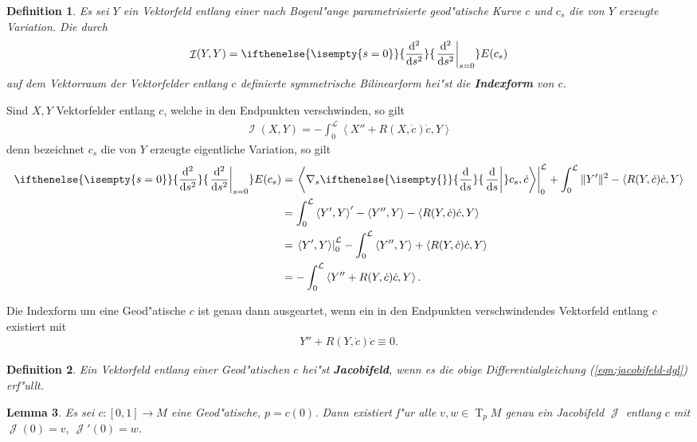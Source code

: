 \documentclass[paper=A4, twoside, chapterprefix=true, bibliography=totoc, headsepline]{scrbook}
\DeclareMathOperator{\calI}{\mathcal{I}}
\DeclareMathOperator{\calJ}{\mathcal{J}}
\DeclareMathOperator{\T}{T} %
\newcommand{\dop}{\mathrm{d}}
\newcommand{\difffrac}[3][]{\ifthenelse{\isempty{#1}}{\frac{\dop #2}{\dop #3}}{\left. \frac{\dop #2}{\dop #3} \right|_{#1}}}
\theoremstyle{plain}
\newtheorem{Dfn}{Definition}[chapter]
\newtheorem{Lemma}[Dfn]{Lemma}
\theoremstyle{nonumberplain}
\theoremstyle{empty}
\theoremstyle{break}
\newcommand{\CmIndex}[2][]{\ifthenelse{\isempty{#1}}{\index{#2}}{\index{#1}}#2}
\newcommand{\CmMark}[2][]{\textbf{\CmIndex[#1]{#2}}}
\begin{document}
\begin{Dfn}
  Es sei $Y$ ein Vektorfeld entlang einer nach Bogenl"ange parametrisierte geod"atische Kurve $c$ und $c_s$ die von $Y$ erzeugte Variation. Die durch
  \begin{align*}
    \calI(Y,Y) = \difffrac[s=0]{^2}{s^2} E(c_s)
  \end{align*}
  auf dem Vektorraum der Vektorfelder entlang $c$ definierte symmetrische Bilinearform hei"st die \CmMark{Indexform} von $c$.
\end{Dfn}

Sind $X,Y$ Vektorfelder entlang $c$, welche in den Endpunkten
verschwinden, so gilt
\begin{align*}
  \calI(X,Y) = -\int_0^{\mathcal L}\left<X'' + R(X,\dot c)\dot
    c,Y\right>
\end{align*}
denn bezeichnet $c_s$ die von $Y$ erzeugte eigentliche Variation, so
gilt
\begin{align*}
  \difffrac[s=0]{^2}{s^2}E(c_s) & = \left.\left<\nabla_s\difffrac{}{s}c_s,\dot c\right>\right|_0^{\mathcal L} + \int_0^{\mathcal L}\|Y'\|^2 - \left<R(Y,\dot c)\dot c,Y\right>\\
  & = \int_0^{\mathcal L}\left<Y',Y\right>' - \left<Y'',Y\right> - \left<R(Y,\dot c)\dot c,Y\right>\\
  & = \left.\left<Y',Y\right>\right|_0^{\mathcal L} - \int_0^{\mathcal L} \left<Y'',Y\right> + \left<R(Y,\dot c)\dot c,Y\right>\\
  & = - \int_0^{\mathcal L}\left<Y'' + R(Y,\dot c) \dot c, Y\right>.
\end{align*}

Die Indexform um eine Geod"atische $c$ ist genau dann ausgeartet, wenn ein in den Endpunkten verschwindendes Vektorfeld entlang $c$ existiert mit
\begin{align}
  Y'' + R(Y,\dot c) \dot c \equiv 0.\label{eqn:jacobifeld-dgl}
\end{align}

\begin{Dfn}
  Ein Vektorfeld entlang einer Geod"atischen $c$ hei"st \CmMark{Jacobifeld}, wenn es die obige Differentialgleichung (\ref{eqn:jacobifeld-dgl}) erf"ullt.
\end{Dfn}

\begin{Lemma}\label{thm:lemma-9-4}
  Es sei $c \colon [0,1] \to M$ eine Geod"atische, $p = c(0)$.
  Dann existiert f"ur alle $v,w \in \T_pM$ genau ein Jacobifeld $\calJ$ entlang $c$ mit $\calJ(0) = v, \ \calJ'(0) = w$.
\end{Lemma}
\end{document}

